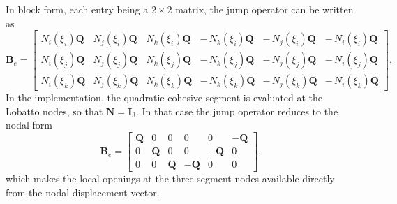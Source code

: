 \documentclass[smallextended]{svjour3}       %
\newcommand{\mat}[1]{\mathbf{#1}}  %
\newcommand{\QQ}{\mat{Q}}          %
\begin{document}
In block form, each entry being a \(2\times2\) matrix, the jump operator can
be written as
\[
\mat B_e=
\begin{bmatrix}
	N_i(\xi_i)\QQ & N_j(\xi_i)\QQ & N_k(\xi_i)\QQ &
	-\,N_k(\xi_i)\QQ & -\,N_j(\xi_i)\QQ & -\,N_i(\xi_i)\QQ
	\\
	N_i(\xi_j)\QQ & N_j(\xi_j)\QQ & N_k(\xi_j)\QQ &
	-\,N_k(\xi_j)\QQ & -\,N_j(\xi_j)\QQ & -\,N_i(\xi_j)\QQ
	\\
	N_i(\xi_k)\QQ & N_j(\xi_k)\QQ & N_k(\xi_k)\QQ &
	-\,N_k(\xi_k)\QQ & -\,N_j(\xi_k)\QQ & -\,N_i(\xi_k)\QQ
\end{bmatrix}.
\]
In the implementation, the quadratic cohesive segment is evaluated at the
Lobatto nodes, so that \(\mat N=\mat I_3\). In that case the jump operator
reduces to the nodal form
\[
\mat B_e=
\begin{bmatrix}
	\QQ & 0 & 0 & 0 & 0 & -\QQ\\
	0 & \QQ & 0 & 0 & -\QQ & 0\\
	0 & 0 & \QQ & -\QQ & 0 & 0
\end{bmatrix},
\]
which makes the local openings at the three segment nodes available
directly from the nodal displacement vector.
\end{document}
